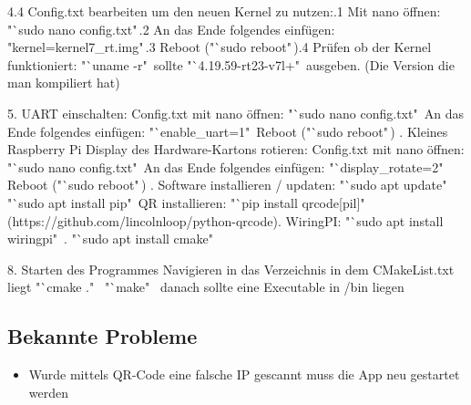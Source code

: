 \documentclass[12pt,a4paper,bibliography=totoc,listof=totoc]{scrartcl}
\begin{document}
4.4 Config.txt bearbeiten um den neuen Kernel zu nutzen:.1 Mit nano öffnen: "`sudo nano config.txt"\,.2 An das Ende folgendes einfügen: "kernel=kernel7\_rt.img"\,.3 Reboot ("`sudo reboot"\,).4 Prüfen ob der Kernel funktioniert: "`uname -r" \,sollte "`4.19.59-rt23-v7l+"\, ausgeben. 
      (Die Version die man kompiliert hat)\newline
\newline

5. UART einschalten: Config.txt mit nano öffnen: "`sudo nano config.txt"\, An das Ende folgendes einfügen: "`enable\_uart=1"\, Reboot ("`sudo reboot"\,)\newline
{}. Kleines Raspberry Pi Display des Hardware-Kartons rotieren: Config.txt mit nano öffnen: "`sudo nano config.txt"\, An das Ende folgendes einfügen: "`display\_rotate=2"\, Reboot ("`sudo reboot"\,)\newline
{}. Software installieren / updaten: "`sudo apt update"\, "`sudo apt install pip"\, QR installieren: "`pip install qrcode[pil]"\,
    (https://github.com/lincolnloop/python-qrcode). WiringPI: "`sudo apt install wiringpi"\ . "`sudo apt install cmake"\ \newline

8. Starten des Programmes  Navigieren in das Verzeichnis in dem CMakeList.txt liegt  "`cmake ."\  "`make"\  danach sollte eine Executable in /bin liegen 


\subsection{Bekannte Probleme}
\begin{itemize}
    \item Wurde mittels QR-Code eine falsche IP gescannt muss die App neu gestartet werden\,
\end {itemize}
\end{document}
